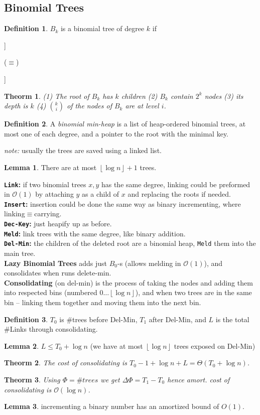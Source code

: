 \documentclass[]{article}
\newcommand\compactsubsection[1]        {\vspace{-10pt}\subsection{#1}\vspace{-5pt}}
\newcommand\oc    {\mathcal{O}}
\newcommand\rf    {\right\rfloor}
\newcommand\lf    {\left\lfloor}
\newcommand\floor [1] {\lf #1 \rf}
\newcommand\Dg        {\Delta}
\newcommand\logn      {\log n}
\newtheorem{Theorem}{Theorm}
\theoremstyle{definition}
\newtheorem{Definition}{Definition}
\newtheorem{Lemma}{Lemma}
\newcommand\theo  [1] {\begin{Theorem}#1\end{Theorem}}
\newcommand\defi  [1] {\begin{Definition}#1\end{Definition}}
\newcommand\lem   [1] {\begin{Lemma}#1\end{Lemma}}
\begin{document}
\begin{multicols}{4}
			\compactsubsection{Binomial Trees}
				\defi{$B_k$ is a binomial tree of degree $k$ if
				
				\hfil \begin{forest}
						[$\cdot$
							[$B_0$]
							[$B_1$]
							[$\cdots$]
							[$B_{k - 1}$]
						]
				\end{forest} ($\equiv$) \begin{forest}
					[$B_{k - 1}$
						[,no edge]
						[$B_{k - 1}$]
					]
				\end{forest}}
				\vspace{36pt}
				\theo{(1) The root of $B_k$ has $k$ children (2) $B_k$ contain $2^{k}$ nodes (3) its depth is $k$ (4) $\binom{k}{i}$ of the nodes of $B_k$ are at level $i$. }
				\defi{A \textit{binomial min-heap} is a list of heap-ordered binomial trees, at most one of each degree, and a pointer to the root with the minimal key. }
				\textit{note: }usually the trees are saved using a linked list. 
				\lem{There are at most $\floor{\logn} + 1$ trees. }
				\textbf{\texttt{Link}: }if two binomial trees $x, y$ has the same degree, linking could be preformed in $\oc(1)$ by attaching $y$ as a child of $x$ and replacing the roots if needed. \\
				\textbf{\texttt{Insert}: }insertion could be done the same way as binary incrementing, where linking$\equiv$carrying. \\
				\textbf{\texttt{Dec-Key}: }just heapify up as before. \\
				\textbf{\texttt{Meld}: }link trees with the same degree, like binary addition. \\
				\textbf{\texttt{Del-Min}: }the children of the deleted root are a binomial heap, \texttt{Meld} them into the main tree. \\
				\textbf{Lazy Binomial Trees} adds just $B_0$-s (allows melding in $\oc(1)$), and consolidates when runs delete-min. \\
				\textbf{Consolidating} (on del-min) is the process of taking the nodes and adding them into respected bins (numbered $0 \dots \floor{\logn}$), and when two trees are in the same bin -- linking them together and moving them into the next bin. 
				\defi{$T_0$ is $\#$trees before Del-Min, $T_1$ after Del-Min, and $L$ is the total $\#$Links through consolidating. }
				\lem{$L \le T_0 + \logn$ (we have at most $\floor{\logn}$ trees exposed on Del-Min)}
				\theo{The cost of consolidating is $T_0 - 1 + \logn + L = \Theta(T_0 + \logn)$. }
				\theo{Using $\Phi = \# trees$ we get $\Dg \Phi = T_1 - T_0$ hence amort. cost of consolidating is $\oc(\logn)$. }
				\lem{incrementing a binary number has an amortized bound of $O(1)$. }
			

\end{multicols}
\end{document}
